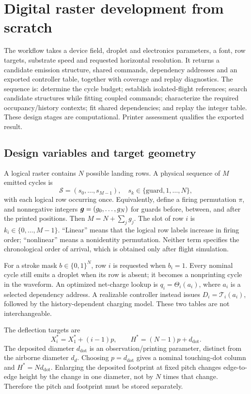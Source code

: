 \section{Digital raster development from scratch}
The workflow takes a device field, droplet and electronics parameters, a font, row targets, substrate speed and requested horizontal resolution. It returns a candidate emission structure, shared commands, dependency addresses and an exported controller table, together with coverage and replay diagnostics. The sequence is: determine the cycle budget; establish isolated-flight references; search candidate structures while fitting coupled commands; characterize the required occupancy/history contexts; fit shared dependencies; and replay the integer table. These design stages are computational. Printer assessment qualifies the exported result.

\subsection{Design variables and target geometry}
A logical raster contains $N$ possible landing rows. A physical sequence of $M$ emitted cycles is
\begin{equation}
 \mathcal S=(s_0,\ldots,s_{M-1}),\quad s_k\in\{\mathrm{guard},1,\ldots,N\},
\end{equation}
with each logical row occurring once. Equivalently, define a firing permutation $\pi$, and nonnegative integers $\boldsymbol{g}=(g_0,\ldots,g_N)$ for guards before, between, and after the printed positions. Then $M=N+\sum_jg_j$. The slot of row $i$ is $k_i\in\{0,\ldots,M-1\}$. ``Linear'' means that the logical row labels increase in firing order; ``nonlinear'' means a nonidentity permutation. Neither term specifies the chronological order of arrival, which is obtained only after flight simulation.

For a stroke mask $b\in\{0,1\}^N$, row $i$ is requested when $b_i=1$. Every nominal cycle still emits a droplet when its row is absent; it becomes a nonprinting cycle in the waveform. An optimized net-charge lookup is $q_i=\Theta_i(a_i)$, where $a_i$ is a selected dependency address. A realizable controller instead issues $D_i=\mathcal T_i(a_i)$, followed by the history-dependent charging model. These two tables are not interchangeable.

The deflection targets are
\begin{equation}
 X_i^*=X_1^*+(i-1)p,\qquad H^*=(N-1)p+d_{\mathrm{dot}}.
\label{eq:target}
\end{equation}
The deposited diameter $d_{\mathrm{dot}}$ is an observation/printing parameter, distinct from the airborne diameter $d_d$. Choosing $p=d_{\mathrm{dot}}$ gives a nominal touching-dot column and $H^*=Nd_{\mathrm{dot}}$. Enlarging the deposited footprint at fixed pitch changes edge-to-edge height by the change in one diameter, not by $N$ times that change. Therefore the pitch and footprint must be stored separately.


